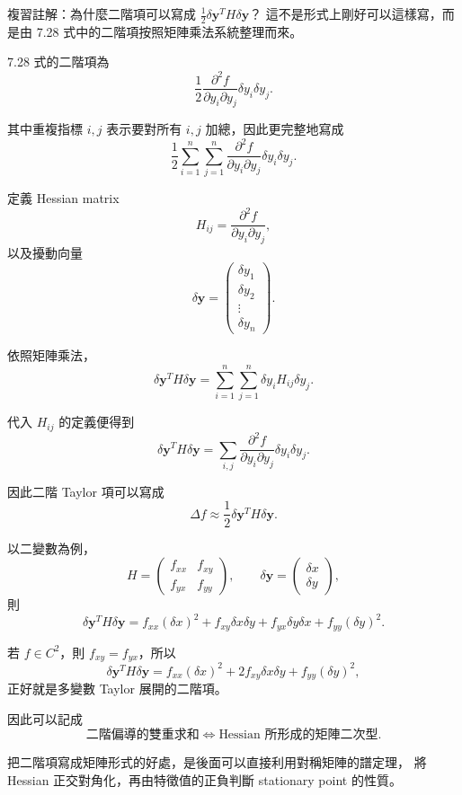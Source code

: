 \documentclass[11pt,a4paper,twoside]{article}
\newcommand{\StudyNote}[2]{\begin{studyNote}{#1}#2\end{studyNote}}
\begin{document}
\StudyNote{複習註解：為什麼二階項可以寫成 $\frac12\delta\mathbf y^T H\delta\mathbf y$？}{
    這不是形式上剛好可以這樣寫，而是由 7.28 式中的二階項按照矩陣乘法系統整理而來。

    7.28 式的二階項為
    \[
        \frac12
        \frac{\partial^2 f}{\partial y_i\partial y_j}
        \delta y_i\delta y_j.
    \]

    其中重複指標 $i,j$ 表示要對所有 $i,j$ 加總，因此更完整地寫成
    \[
        \frac12
        \sum_{i=1}^{n}\sum_{j=1}^{n}
        \frac{\partial^2 f}{\partial y_i\partial y_j}
        \delta y_i\delta y_j.
    \]

    定義 Hessian matrix
    \[
        H_{ij}
        =
        \frac{\partial^2 f}{\partial y_i\partial y_j},
    \]
    以及擾動向量
    \[
        \delta\mathbf y
        =
        \begin{pmatrix}
            \delta y_1 \\
            \delta y_2 \\
            \vdots     \\
            \delta y_n
        \end{pmatrix}.
    \]

    依照矩陣乘法，
    \[
        \delta\mathbf y^T H\delta\mathbf y
        =
        \sum_{i=1}^{n}\sum_{j=1}^{n}
        \delta y_iH_{ij}\delta y_j.
    \]

    代入 $H_{ij}$ 的定義便得到
    \[
        \delta\mathbf y^T H\delta\mathbf y
        =
        \sum_{i,j}
        \frac{\partial^2 f}{\partial y_i\partial y_j}
        \delta y_i\delta y_j.
    \]

    因此二階 Taylor 項可以寫成
    \[
        \boxed{
            \Delta f
            \approx
            \frac12\delta\mathbf y^T H\delta\mathbf y.
        }
    \]

    以二變數為例，
    \[
        H=
        \begin{pmatrix}
            f_{xx} & f_{xy} \\
            f_{yx} & f_{yy}
        \end{pmatrix},
        \qquad
        \delta\mathbf y=
        \begin{pmatrix}
            \delta x \\
            \delta y
        \end{pmatrix},
    \]
    則
    \[
        \delta\mathbf y^T H\delta\mathbf y
        =
        f_{xx}(\delta x)^2
        +
        f_{xy}\delta x\delta y
        +
        f_{yx}\delta y\delta x
        +
        f_{yy}(\delta y)^2.
    \]

    若 $f\in C^2$，則 $f_{xy}=f_{yx}$，所以
    \[
        \delta\mathbf y^T H\delta\mathbf y
        =
        f_{xx}(\delta x)^2
        +
        2f_{xy}\delta x\delta y
        +
        f_{yy}(\delta y)^2,
    \]
    正好就是多變數 Taylor 展開的二階項。

    因此可以記成
    \[
        \boxed{
            \text{二階偏導的雙重求和}
            \Longleftrightarrow
            \text{Hessian 所形成的矩陣二次型}.
        }
    \]

    把二階項寫成矩陣形式的好處，是後面可以直接利用對稱矩陣的譜定理，
    將 Hessian 正交對角化，再由特徵值的正負判斷 stationary point 的性質。
}
\end{document}
